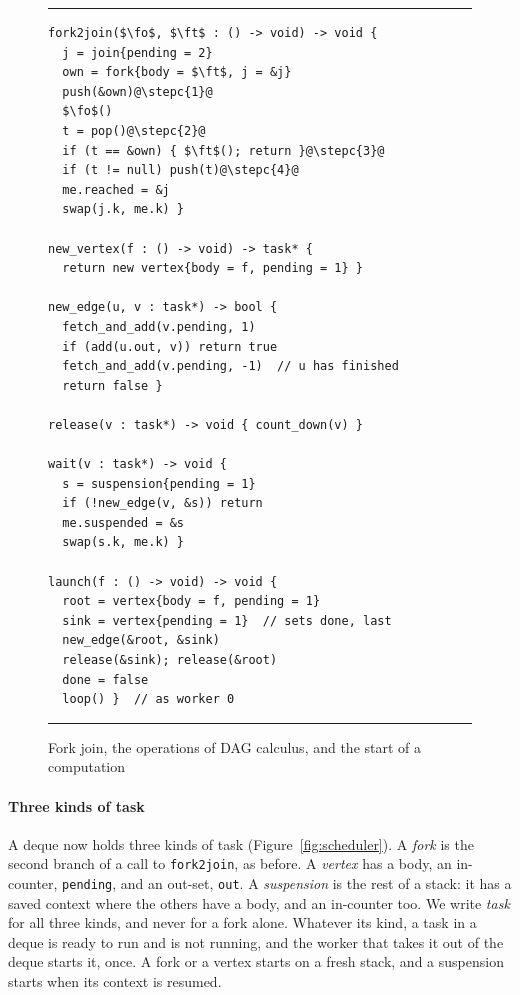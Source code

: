 \documentclass[sigplan,nonacm]{acmart}
\newcommand{\fo}{\mathtt{f_1}}
\newcommand{\ft}{\mathtt{f_2}}
\newcommand{\stepc}[1]{\hfill{\rmfamily\slshape // (#1)}}
\begin{document}
\begin{figure}
\hrule
\begin{lstlisting}[escapechar=@]
fork2join($\fo$, $\ft$ : () -> void) -> void {
  j = join{pending = 2}
  own = fork{body = $\ft$, j = &j}
  push(&own)@\stepc{1}@
  $\fo$()
  t = pop()@\stepc{2}@
  if (t == &own) { $\ft$(); return }@\stepc{3}@
  if (t != null) push(t)@\stepc{4}@
  me.reached = &j
  swap(j.k, me.k) }

new_vertex(f : () -> void) -> task* {
  return new vertex{body = f, pending = 1} }

new_edge(u, v : task*) -> bool {
  fetch_and_add(v.pending, 1)
  if (add(u.out, v)) return true
  fetch_and_add(v.pending, -1)  // u has finished
  return false }

release(v : task*) -> void { count_down(v) }

wait(v : task*) -> void {
  s = suspension{pending = 1}
  if (!new_edge(v, &s)) return
  me.suspended = &s
  swap(s.k, me.k) }

launch(f : () -> void) -> void {
  root = vertex{body = f, pending = 1}
  sink = vertex{pending = 1}  // sets done, last
  new_edge(&root, &sink)
  release(&sink); release(&root)
  done = false
  loop() }  // as worker 0
\end{lstlisting}
\hrule
\caption{Fork join, the operations of DAG calculus, and the start of a
  computation}
\label{fig:ops}
\end{figure}

\paragraph{Three kinds of task}
%
A deque now holds three kinds of task
(Figure~\ref{fig:scheduler}).
%
A \emph{fork} is the second branch of a call to
\lstinline|fork2join|, as before.
%
A \emph{vertex} has a body, an in-counter, \lstinline|pending|, and an
out-set, \lstinline|out|.
%
A \emph{suspension} is the rest of a stack: it has a saved context
where the others have a body, and an in-counter too.
%
We write \emph{task} for all three kinds, and never for a fork alone.
%
Whatever its kind, a task in a deque is ready to run and is not
running, and the worker that takes it out of the deque starts it,
once.
%
A fork or a vertex starts on a fresh stack, and a suspension starts
when its context is resumed.
\end{document}
